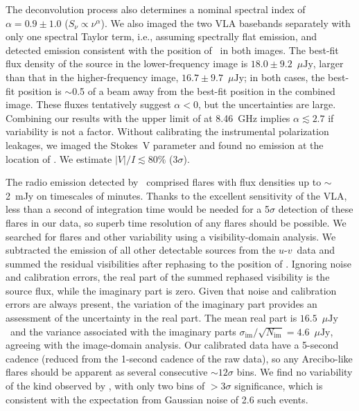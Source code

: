 \documentclass[iop]{emulateapj}
\newcommand\ujy{\ensuremath{\mu\text{Jy}}}
\newcommand\vtwom{2M\,1047+21} %
\newcommand\twom{\object{\vtwom}}
\newcommand\apx{\ensuremath{\sim}}
\newcommand\uv{$u$\mbox{-}$v$}
\begin{document}
The deconvolution process also determines a nominal spectral index of $\alpha
= 0.9 \pm 1.0$ ($S_\nu \propto \nu^\alpha$). We also imaged the two VLA
basebands separately with only one spectral Taylor term, i.e., assuming
spectrally flat emission, and detected emission consistent with the position
of \twom\ in both images. The best-fit flux density of the source in the
lower-frequency image is $18.0\pm9.2$~\ujy, larger than that in the
higher-frequency image, $16.7\pm9.7$~\ujy; in both cases, the best-fit
position is \apx0.5 of a beam away from the best-fit position in the combined
image. These fluxes tentatively suggest $\alpha < 0$, but the uncertainties
are large. Combining our results with the upper limit of \citet{b06b} at
8.46~GHz implies $\alpha \lesssim 2.7$ if variability is not a factor. Without
calibrating the instrumental polarization leakages, we imaged the Stokes~V
parameter and found no emission at the location of \twom. We estimate $|V|/I
\lesssim 80\%$ ($3\sigma$).

The radio emission detected by \rw\ comprised flares with flux densities up to
\apx 2~mJy on timescales of minutes. Thanks to the excellent sensitivity of
the VLA, less than a second of integration time would be needed for a
5$\sigma$ detection of these flares in our data, so superb time resolution of
any flares should be possible. We searched for flares and other variability
using a visibility-domain analysis. We subtracted the emission of all other
detectable sources from the \uv\ data and summed the residual visibilities
after rephasing to the position of \twom. Ignoring noise and calibration
errors, the real part of the summed rephased visibility is the source flux,
while the imaginary part is zero. Given that noise and calibration errors are
always present, the variation of the imaginary part provides an assessment of
the uncertainty in the real part. The mean real part is $16.5$~\ujy\ and the
variance associated with the imaginary parts
$\sigma_\text{im}/\sqrt{N_\text{im}} = 4.6$~\ujy, agreeing with the
image-domain analysis. Our calibrated data have a 5-second cadence (reduced
from the 1-second cadence of the raw data), so any Arecibo-like flares should
be apparent as several consecutive \apx$12\sigma$ bins. We find no variability
of the kind observed by \rw, with only two bins of $>$$3\sigma$ significance,
which is consistent with the expectation from Gaussian noise of 2.6 such
events.
\end{document}
